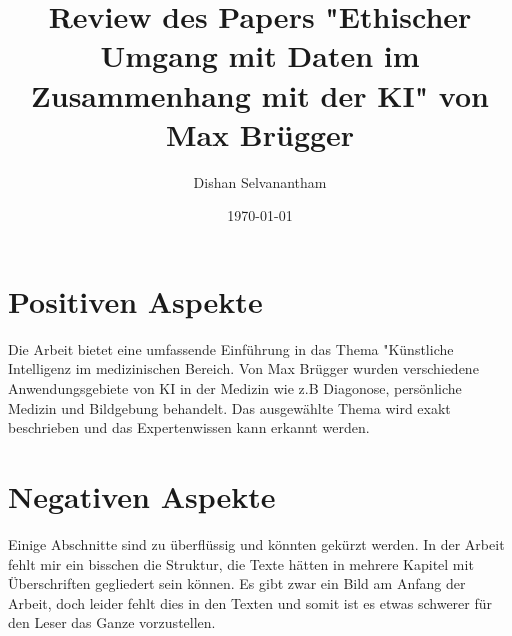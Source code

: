 \documentclass{article}
\title{Review des Papers "Ethischer Umgang mit Daten im Zusammenhang mit der KI" von Max Brügger}
\author{Dishan Selvanantham}
\date{\today}
\begin{document}
\maketitle


\section{Positiven Aspekte}

Die Arbeit bietet eine umfassende Einführung in das Thema "Künstliche Intelligenz im medizinischen Bereich. Von Max Brügger wurden verschiedene Anwendungsgebiete von KI in der Medizin wie z.B Diagonose, persönliche Medizin und Bildgebung behandelt.
Das ausgewählte Thema wird exakt beschrieben und das Expertenwissen kann erkannt werden. 


\section{Negativen Aspekte}

Einige Abschnitte sind zu überflüssig und könnten gekürzt werden. In der Arbeit fehlt mir ein bisschen die Struktur, die Texte hätten in mehrere Kapitel mit Überschriften gegliedert sein können.
Es gibt zwar ein Bild am Anfang der Arbeit, doch leider fehlt dies in den Texten und somit ist es etwas schwerer für den Leser das Ganze vorzustellen.
\printbibliography
\end{document}

